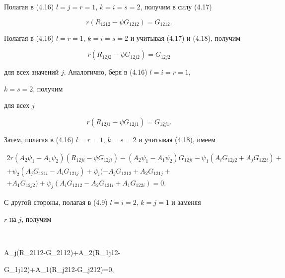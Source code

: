 Полагая в (4.16) $l=j=r=1$, $k=i=s=2$, получим в силу (4.17)


\begin{equation}


r(R_{1212}-\psi G_{1212})=G_{1212}.\tag{4.18}


\end{equation}


Полагая в (4.16) $l=r=1$, $k=i=s=2$ и учитывая (4.17) и (4.18), получим


\begin{equation}


r(R_{12j2}-\psi G_{12j2})=G_{12j2}\tag{4.19}


\end{equation}


для всех значений $j$. Аналогично, беря в (4.16) $l=i=r=1$,


$k=s=2$, получим


для всех $j$


\begin{equation}


r(R_{12j1}-\psi G_{12j1})=G_{12j1}.\tag{4.20}


\end{equation}


Затем, полагая в (4.16) $l=r=1$, $k=s=2$ и учитывая (4.18), имеем


\begin{multline}


2r(A_2\psi_1-A_1\psi_2)(R_{12ji}-\psi G_{12ji})-


(A_2\psi_1-A_1\psi_2)G_{12ji}-


\psi_1(A_iG_{12j2}+A_jG_{122i}) + \\


+\psi_2(A_jG_{121i}-A_iG_{121j})+ 


\psi_i(-A_jG_{1212}+A_2G_{121j}+ \\


+ A_1G_{12j2})+ 


\psi_j(A_iG_{1212}-A_2G_{121i}+A_1G_{122i})=0.


\tag{4.21}


\end{multline}


С другой стороны, полагая в (4.9) $l=i=2$, $k=j=1$ и заменяя


$r$ на $j$, получим


$$


A_j(R_{2112}-\psi G_{2112})+A_2(R_{1j12}-


\psi G_{1j12})+A_1(R_{j212}-\psi G_{j212})=0,


